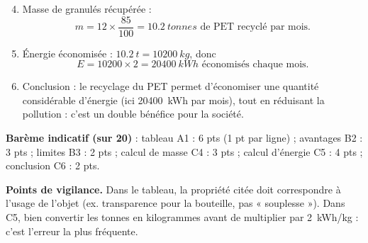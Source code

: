\documentclass[11pt]{article}
\begin{document}
\begin{corrige}
\begin{enumerate}
\setcounter{enumi}{3}
\item Masse de granulés récupérée :
\[ m = 12 \times \frac{85}{100} = \SI{10,2}{tonnes} \text{ de PET recyclé par mois.} \]
\item Énergie économisée : $\SI{10,2}{t} = \SI{10200}{kg}$, donc
\[ E = \num{10200} \times 2 = \SI{20400}{kWh} \text{ économisés chaque mois.} \]
\item Conclusion : le recyclage du PET permet d'économiser une quantité considérable d'énergie (ici \SI{20400}{kWh} par mois), tout en réduisant la pollution : c'est un double bénéfice pour la société.
\end{enumerate}
\textbf{Barème indicatif (sur 20)} : tableau A1 : 6 pts (1 pt par ligne) ; avantages B2 : 3 pts ; limites B3 : 2 pts ; calcul de masse C4 : 3 pts ; calcul d'énergie C5 : 4 pts ; conclusion C6 : 2 pts.

\textbf{Points de vigilance.} Dans le tableau, la propriété citée doit correspondre à l'usage de l'objet (ex. transparence pour la bouteille, pas « souplesse »). Dans C5, bien convertir les tonnes en kilogrammes avant de multiplier par \SI{2}{kWh/kg} : c'est l'erreur la plus fréquente.
\end{corrige}
\end{document}
